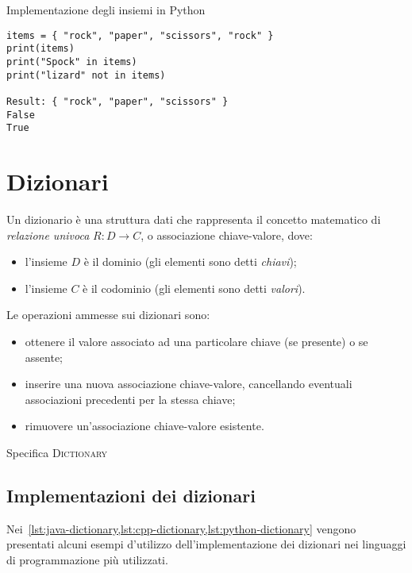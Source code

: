 \begin{listing}[H]
\caption{Implementazione degli insiemi in Python}%
\label{lst:python-set}
\begin{verbatim}
items = { "rock", "paper", "scissors", "rock" }
print(items)
print("Spock" in items)
print("lizard" not in items)

Result: { "rock", "paper", "scissors" }
False
True
\end{verbatim}
\end{listing}
\vspace{-25pt}

\section{Dizionari}

Un dizionario è una struttura dati che rappresenta il concetto matematico di \emph{relazione univoca} \(R : D \to C\), o associazione chiave-valore, dove:
\begin{itemize}
	\item l'insieme \(D\) è il dominio (gli elementi sono detti \emph{chiavi});
	\item l'insieme \(C\) è il codominio (gli elementi sono detti \emph{valori}).
\end{itemize}

Le operazioni ammesse sui dizionari sono:
\begin{itemize}
	\item ottenere il valore associato ad una particolare chiave (se presente) o \Nil se assente;
	\item inserire una nuova associazione chiave-valore, cancellando eventuali associazioni precedenti per la stessa chiave;
	\item rimuovere un'associazione chiave-valore esistente.
\end{itemize}

\begin{algorithm}[H]
	\caption[Specifica dizionario]{Specifica \textsc{Dictionary}}
	
\end{algorithm}

\subsection{Implementazioni dei dizionari}

Nei~\cref{lst:java-dictionary,lst:cpp-dictionary,lst:python-dictionary} vengono presentati alcuni esempi d'utilizzo dell'implementazione dei dizionari nei linguaggi di programmazione più utilizzati.

